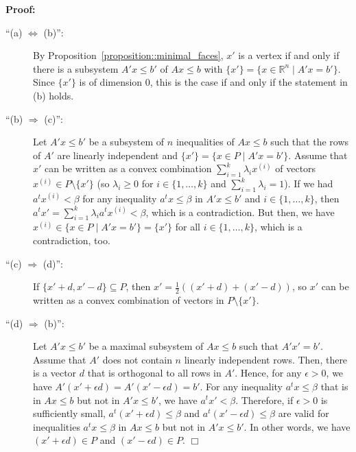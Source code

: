 \documentclass[12pt, showidx, twoside]{article}
\def\prove{\par \noindent \hbox{\bf Proof:}\quad}
\def\endproof{\hfill{$\Box$}}
\def\R{\mathbb{R}}
\begin{document}
{{{\prove
\begin{description}
   \item[``(a) $\Leftrightarrow$ (b)'':] 
          By Proposition~\ref{proposition::minimal_faces}, $x'$ is a vertex if and only if
          there is a subsystem $A'x \leq b'$ of $Ax\leq b$ with 
          $\{x'\} = \{x \in \R^n \mid A'x=b'\}$. Since $\{x'\}$ is of dimension $0$, this is
          the case if and only if the statement in (b) holds.
   \item[``(b) $\Rightarrow$ (c)'':] Let $A' x \leq b'$ be a subsystem of
          $n$ inequalities of $Ax \leq b$ 
          such that the rows of $A'$ are linearly independent and
          $\{x'\} = \{x \in P \mid A'x = b'\}$. Assume that $x'$ can be 
          written as a convex combination $\sum_{i=1}^{k}\lambda_i x^{(i)}$ of vectors
          $x^{(i)} \in P \setminus\{x'\}$ (so $\lambda_i \geq 0$ for $i \in \{1,\dots,k\}$
          and $\sum_{i=1}^{k}\lambda_i = 1$). If we had $a^t x^{(i)} < \beta$ for any
          inequality $a^t x \leq \beta$ in $A' x \leq b'$ and 
          $i \in \{1,\dots,k\}$, then $a^t x' = \sum_{i=1}^{k}\lambda_i a^t x^{(i)} < \beta$,
          which is a contradiction. But then, we have 
          $x^{(i)} \in \{x \in P \mid A'x = b'\} = \{x'\}$ for all $i \in \{1,\dots,k\}$, which
          is a contradiction, too.
   \item[``(c) $\Rightarrow$ (d)'':] If $\{x' + d, x' - d\} \subseteq P$, then 
          $x' = \frac{1}{2}((x' + d) + (x' - d))$, so $x'$ can be written as a convex
          combination of vectors in $P \setminus\{x'\}$.
   \item[``(d) $\Rightarrow$ (b)'':] Let $A' x \leq b'$ be a maximal subsystem of $Ax \leq b$ 
          such that $A'x' = b'$. Assume that $A'$ does not contain $n$ linearly independent 
          rows. Then, there is a vector $d$ that is orthogonal to all rows in $A'$. 
          Hence, for any $\epsilon > 0$, we have $A'(x' + \epsilon d) = A'(x' - \epsilon d) = b'$.
          For any inequality $a^tx \leq \beta$ that is in $Ax\leq b$ but not in $A'x\leq b'$, 
          we have $a^t x' < \beta$.
          Therefore, if $\epsilon > 0$ is sufficiently small, $a^t (x' + \epsilon d) \leq \beta$
          and $a^t (x' - \epsilon d) \leq \beta$ are valid for inequalities $a^tx \leq \beta$
          in $Ax\leq b$ but not in $A'x\leq b'$.
          In other words, we have $(x' + \epsilon d) \in P$ and $(x' - \epsilon d) \in P$.
\endproof
\end{description}



}}}
\end{document}
